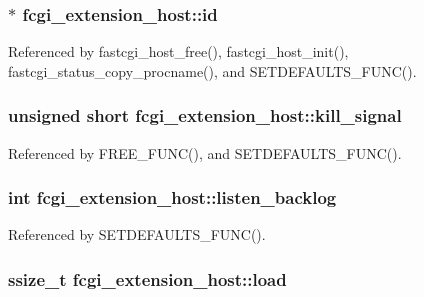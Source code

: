 \hypertarget{structfcgi__extension__host_a0b39658d0376f369c480f2cce166467e}{
\subsubsection[{id}]{$\ast$ fcgi\-\_\-extension\-\_\-host\-::id}}\label{structfcgi__extension__host_a0b39658d0376f369c480f2cce166467e}


Referenced by fastcgi\-\_\-host\-\_\-free(), fastcgi\-\_\-host\-\_\-init(), fastcgi\-\_\-status\-\_\-copy\-\_\-procname(), and S\-E\-T\-D\-E\-F\-A\-U\-L\-T\-S\-\_\-\-F\-U\-N\-C().

\hypertarget{structfcgi__extension__host_ab2ba5563fd48db1f1ceaa2b9faaebfb3}{
\subsubsection[{kill\-\_\-signal}]{\setlength{\rightskip}{0pt plus 5cm}unsigned short fcgi\-\_\-extension\-\_\-host\-::kill\-\_\-signal}}\label{structfcgi__extension__host_ab2ba5563fd48db1f1ceaa2b9faaebfb3}


Referenced by F\-R\-E\-E\-\_\-\-F\-U\-N\-C(), and S\-E\-T\-D\-E\-F\-A\-U\-L\-T\-S\-\_\-\-F\-U\-N\-C().

\hypertarget{structfcgi__extension__host_a3506ef25504b8bbb690cff023e584b9a}{
\subsubsection[{listen\-\_\-backlog}]{\setlength{\rightskip}{0pt plus 5cm}int fcgi\-\_\-extension\-\_\-host\-::listen\-\_\-backlog}}\label{structfcgi__extension__host_a3506ef25504b8bbb690cff023e584b9a}


Referenced by S\-E\-T\-D\-E\-F\-A\-U\-L\-T\-S\-\_\-\-F\-U\-N\-C().

\hypertarget{structfcgi__extension__host_aff5283f567341a8ffa727dcf83fc0254}{
\subsubsection[{load}]{\setlength{\rightskip}{0pt plus 5cm}ssize\-\_\-t fcgi\-\_\-extension\-\_\-host\-::load}}\label{structfcgi__extension__host_aff5283f567341a8ffa727dcf83fc0254}


